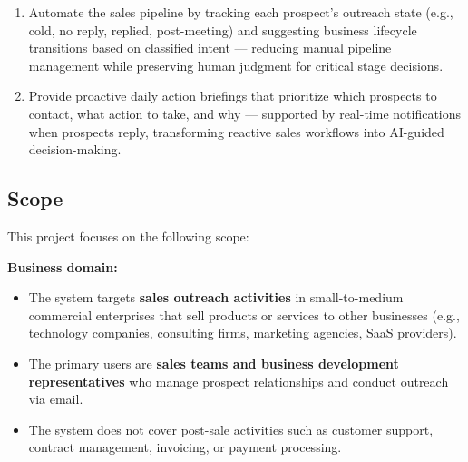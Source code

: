 \documentclass[a4paper]{article}
\begin{document}
\begin{enumerate}
  \item Automate the sales pipeline by tracking each prospect's 
  outreach state (e.g., cold, no reply, replied, post-meeting) 
  and suggesting business lifecycle transitions based on classified 
  intent --- reducing manual pipeline management while preserving 
  human judgment for critical stage decisions.

  \item Provide proactive daily action briefings that prioritize 
  which prospects to contact, what action to take, and why --- 
  supported by real-time notifications when prospects reply, 
  transforming reactive sales workflows into AI-guided 
  decision-making.
\end{enumerate}


\subsection{Scope}

This project focuses on the following scope:

\textbf{Business domain:}
\begin{itemize}
  \item The system targets \textbf{sales outreach activities} 
  in small-to-medium commercial enterprises that sell products 
  or services to other businesses (e.g., technology companies, 
  consulting firms, marketing agencies, SaaS providers).

  \item The primary users are \textbf{sales teams and business 
  development representatives} who manage prospect relationships 
  and conduct outreach via email.

  \item The system does not cover post-sale activities such as 
  customer support, contract management, invoicing, or payment 
  processing.
\end{itemize}
\end{document}
